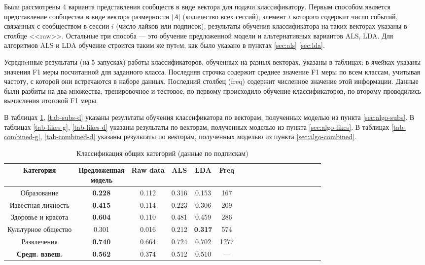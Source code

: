 \documentclass[times,specification,annotation]{itmo-student-thesis}
\begin{document}
Были рассмотрены 4 варианта представления сообществ в виде вектора для подачи классификатору. Первым способом является представление сообщества в виде вектора размерности $|A|$ (количество всех сессий), элемент $i$ которого содержит число событий, связанных с сообществом в сессии $i$ (число лайков или подписок), результаты обучения классификатора на таких векторах указаны в столбце <<raw>>. Остальные три способа --- это обучение предложенной модели и альтернативных вариантов ALS, LDA. Для алгоритмов ALS и LDA обучение строится таким же путeм, как было указано в пунктах \ref{sec:als} \ref{sec:lda}.  

Усреднeнные результаты (на 5 запусках) работы классификаторов, обученных на разных векторах, указаны в таблицах: в ячейках указаны значения F1 меры посчитанной для заданного класса. Последняя строчка содержит среднее значение F1 меры по всем классам, учитывая частоту, с которой они встречаются в наборе данных. Последний столбец (freq) содержит численное значение этой информации. Данные были разбиты на два множества, тренировочное и тестовое, по первому происходило обучение классификаторов, по второму проводились вычисления итоговой F1 меры.

В таблицах \ref{tab-subs-g}, \ref{tab-subs-d} указаны результаты обучения классификатора по векторам, полученных моделью из пункта \ref{sec:algo-subs}. В таблицах \ref{tab-likes-g}, \ref{tab-likes-d} указаны результаты по векторам, полученных моделью из пункта \ref{sec:algo-likes}. В таблицах \ref{tab-combined-g}, \ref{tab-combined-d} указаны результаты по векторам, полученных моделью из пункта \ref{sec:algo-combined}. 

\begin{table}[!h]
\caption{Классификация общих категорий (данные по подпискам)}\label{tab-subs-g}
\centering
\begin{tabular}{|*{18}{c|}}\hline
    Категория & \thead{Предложенная \\ модель}  & Raw data & ALS & LDA & Freq \\\hline
Образование     & \textbf{0.228} & 0.112 & 0.316 & 0.153 & 167 \\\hline
Известная личность             & \textbf{0.415} & 0.114 & 0.223 & 0.306 & 209 \\\hline
Здоровье и красота             & \textbf{0.604} & 0.110 & 0.481 & 0.459 & 286 \\\hline
Культурное общество         & 0.301 & 0.016 & 0.212 & \textbf{0.317} & 574  \\\hline
Развлечения                           & \textbf{0.740} & 0.664 & 0.724 & 0.702 & 1277 \\\hline
\textbf{Средн. взвеш.}      & \textbf{0.562} & 0.374 & 0.512 & 0.510 & --- \\\hline
\end{tabular}
\end{table}
\end{document}
